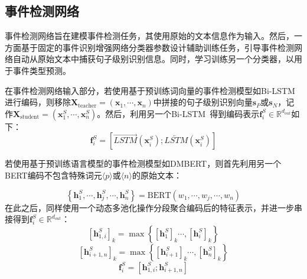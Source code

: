 \subsection{事件检测网络}

事件检测网络旨在建模事件检测任务，其使用原始的文本信息作为输入。然后，一方面基于固定的事件识别增强网络分类器参数设计辅助训练任务，引导事件检测网络自动从原始文本中捕获句子级别识别信息。同时，学习训练另一个分类器，以用于事件类型预测。

在事件检测网络输入部分，若使用基于预训练词向量的事件检测模型如Bi-LSTM进行编码，则移除$\boldsymbol{X}_\textrm{teacher} = (\boldsymbol{x}_{1}, \cdots, \boldsymbol{x}_{n})$中拼接的句子级别识别向量$\boldsymbol{s}_P$或$\boldsymbol{s}_N$，记作$\boldsymbol{X}_\textrm{student} = (\boldsymbol{x}_{1}^{S}, \cdots, \boldsymbol{x}_{n}^{S})$。然后，利用另一个Bi-LSTM~\cite{hochreiter1997long}得到编码表示$\boldsymbol{f}_i^{S} \in {\mathbb{R}}^{d_{out}}$如下：
\begin{equation}
\label{eq3_8}
\boldsymbol{f}_i^{S}=\left[\overrightarrow{LSTM}\left(\boldsymbol{x}_{i}^{S}\right) ; \overleftarrow{LSTM}\left(\boldsymbol{x}_{i}^{S}\right)\right]
\end{equation}

若使用基于预训练语言模型的事件检测模型如DMBERT，则首先利用另一个BERT编码不包含特殊词元$\langle p \rangle$或$\langle n \rangle$的原始文本：

\begin{equation}
  \left\{\boldsymbol{h}_{1}^{S},\cdots,\boldsymbol{h}_{j}^{S},\cdots,\boldsymbol{h}_{n}^{S}\right\}=\textrm{BERT}(w_{1},\cdots, w_{j},\cdots, w_{n})
\end{equation}
在此之后，同样使用一个动态多池化操作分段聚合编码后的特征表示，并进一步串接得到$\boldsymbol{f}_i^{S} \in {\mathbb{R}}^{d_{out}}$：
\begin{equation}
    \left[\boldsymbol{h}_{1, i}^{S}\right]_{k}=\max \left\{\left[\boldsymbol{h}_{1}^{S}\right]_{k} \cdots,\left[\boldsymbol{h}_{i}^{S}\right]_{k}\right\}
\end{equation}
\begin{equation}
    \left[\boldsymbol{{h}}_{i+1, n}^{S}\right]_{k}=\max \left\{\left[\boldsymbol{h}_{i+1}^{S}\right]_{k} \cdots,\left[\boldsymbol{h}_{n}^{S}\right]_{k}\right\}
\end{equation}
\begin{equation}
\label{input_information}
\boldsymbol{f}_i^{S}=\left[\boldsymbol{h}_{1, i}^{S};\boldsymbol{{h}}_{i+1, n}^{S}\right]
\end{equation}

